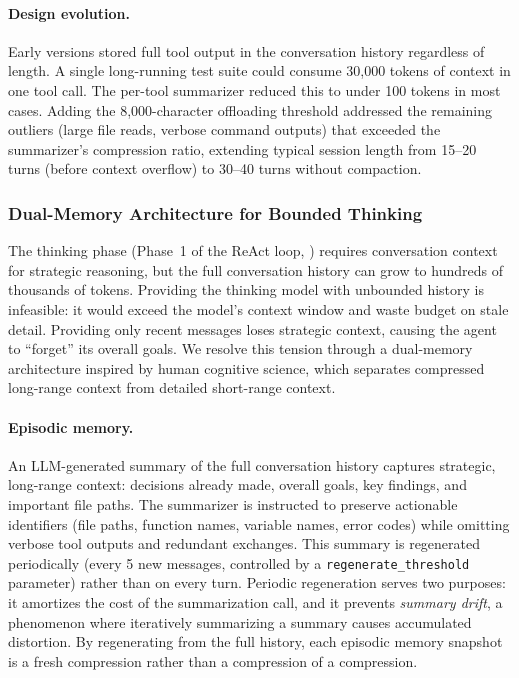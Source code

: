 \paragraph{Design evolution.} Early versions stored full tool output in the conversation history regardless of length. A single long-running test suite could consume 30{,}000 tokens of context in one tool call. The per-tool summarizer reduced this to under 100 tokens in most cases. Adding the 8{,}000-character offloading threshold addressed the remaining outliers (large file reads, verbose command outputs) that exceeded the summarizer's compression ratio, extending typical session length from 15--20 turns (before context overflow) to 30--40 turns without compaction.

\subsubsection{Dual-Memory Architecture for Bounded Thinking}
\label{sec:dual_memory}

The thinking phase (Phase~1 of the ReAct loop, ) requires conversation context for strategic reasoning, but the full conversation history can grow to hundreds of thousands of tokens. Providing the thinking model with unbounded history is infeasible: it would exceed the model's context window and waste budget on stale detail. Providing only recent messages loses strategic context, causing the agent to ``forget'' its overall goals. We resolve this tension through a dual-memory architecture inspired by human cognitive science, which separates compressed long-range context from detailed short-range context.

\paragraph{Episodic memory.}
An LLM-generated summary of the full conversation history captures strategic, long-range context: decisions already made, overall goals, key findings, and important file paths. The summarizer is instructed to preserve actionable identifiers (file paths, function names, variable names, error codes) while omitting verbose tool outputs and redundant exchanges. This summary is regenerated periodically (every 5 new messages, controlled by a \texttt{regenerate\_threshold} parameter) rather than on every turn. Periodic regeneration serves two purposes: it amortizes the cost of the summarization call, and it prevents \emph{summary drift}, a phenomenon where iteratively summarizing a summary causes accumulated distortion. By regenerating from the full history, each episodic memory snapshot is a fresh compression rather than a compression of a compression.

